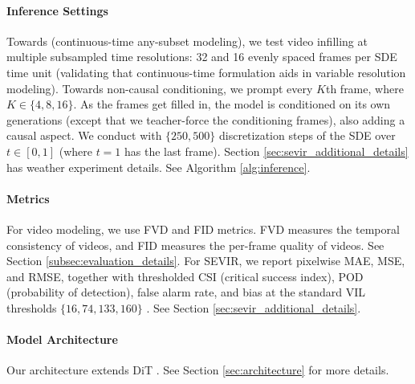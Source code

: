 \documentclass{article}
\begin{document}
\paragraph{Inference Settings}
Towards  (continuous-time any-subset modeling), we test video infilling at multiple subsampled time resolutions: 32 and 16 evenly spaced frames per SDE time unit (validating that continuous-time formulation aids in variable resolution modeling). Towards non-causal conditioning, we prompt every $K$th frame, where $K \in \{4, 8, 16\}$. As the frames get filled in, the model is conditioned on its own generations (except that we teacher-force the conditioning frames), also adding a causal aspect. We conduct with $\{250, 500\}$ discretization steps of the SDE over $t \in [0, 1]$ (where $t = 1$ has the last frame). Section \ref{sec:sevir_additional_details} has weather experiment details.
See Algorithm \ref{alg:inference}.

\paragraph{Metrics} For video modeling, we use FVD \cite{fvd_unterthiner2018towards, ge2024content} and FID \cite{fid_heusel2017gans} metrics. FVD measures the temporal consistency of videos, and FID measures the per-frame quality of videos. See Section \ref{subsec:evaluation_details}.
For SEVIR, we report pixelwise MAE, MSE, and RMSE, together with thresholded CSI (critical success index), POD (probability of detection), false alarm rate, and bias at the standard VIL thresholds $\{16,74,133,160\}$ \cite{veillette2020sevir}. %
See Section \ref{sec:sevir_additional_details}.

\paragraph{Model Architecture}
Our architecture extends DiT \cite{peebles2023scalable}. See Section \ref{sec:architecture} for more details.
\end{document}
